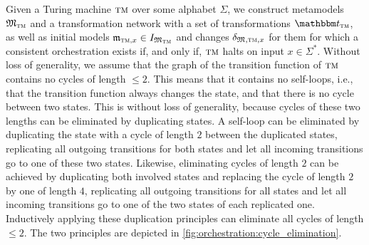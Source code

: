 Given a Turing machine $\textsc{tm}$ over some alphabet $\Sigma$, we construct metamodels $\metamodeltuple{M}_{\TuringMachine}$ and a transformation network with a set of transformations $\transformationset{T}_{\TuringMachine}$, as well as initial models $\modeltuple{m}_{\TuringMachine, x} \in \metamodeltupleinstanceset{M_{\TuringMachine}}$ and changes $\changetuple{\metamodeltuple{M},\TuringMachine,x}$ for them for which a consistent orchestration exists if, and only if, $\textsc{tm}$ halts on input $x \in \Sigma^*$.
Without loss of generality, we assume that the graph of the transition function of $\textsc{tm}$ contains no cycles of length $\leq 2$.
This means that it contains no self-loops, i.e., that the transition function always changes the state, and that there is no cycle between two states.
This is without loss of generality, because cycles of these two lengths can be eliminated by duplicating states.
A self-loop can be eliminated by duplicating the state with a cycle of length $2$ between the duplicated states,  replicating all outgoing transitions for both states and let all incoming transitions go to one of these two states.
Likewise, eliminating cycles of length $2$ can be achieved by duplicating both involved states and replacing the cycle of length $2$ by one of length $4$, replicating all outgoing transitions for all states and let all incoming transitions go to one of the two states of each replicated one.
Inductively applying these duplication principles can eliminate all cycles of length $\leq 2$.
The two principles %
are depicted in \autoref{fig:orchestration:cycle_elimination}.


